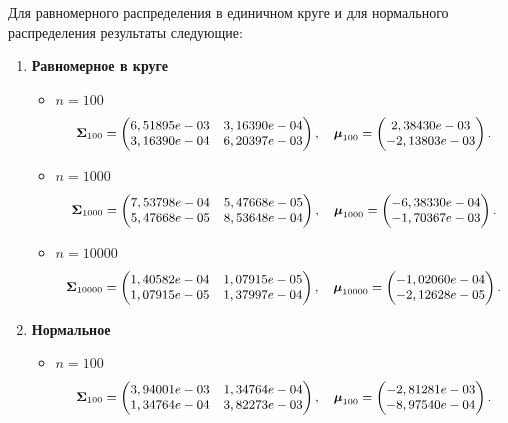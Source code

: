 \documentclass[specialist,
substylefile = spbu.rtx,
               subf,href,colorlinks=true, 12pt]{disser}
\begin{document}
Для равномерного распределения в единичном круге и для нормального распределения результаты следующие:

\begin{enumerate}
    \item \textbf{Равномерное в круге}
    
    \begin{itemize}
    \item $n=100$
    \[\small 
      \mathbf{\Sigma}_{100}=\begin{pmatrix}
6,51895e-03 & 3,16390e-04 \\
3,16390e-04 & 6,20397e-03 
\end{pmatrix}, \quad \boldsymbol{\mu}_{100}= \begin{pmatrix}
2,38430e-03  \\
-2,13803e-03
\end{pmatrix}.
    \]
    
    \item $n=1000$
    \[
    \small 
      \mathbf{\Sigma}_{1000}= \begin{pmatrix}
7,53798e-04 & 5,47668e-05  \\
5,47668e-05 & 8,53648e-04
\end{pmatrix}, \quad \boldsymbol{\mu}_{1000}=\begin{pmatrix}
-6,38330e-04  \\
-1,70367e-03
\end{pmatrix}.
    \]
    
    \item $n=10000$ 
    \[
    \small 
     \mathbf{\Sigma}_{10000}=
\begin{pmatrix}
1,40582e-04 & 1,07915e-05 \\
1,07915e-05 & 1,37997e-04
\end{pmatrix}, \quad \boldsymbol{\mu}_{10000}= \begin{pmatrix}
-1,02060e-04  \\
-2,12628e-05 
\end{pmatrix}.
    \]
\end{itemize}    

    \item \textbf{Нормальное}

        \begin{itemize}
    \item $n=100$
    \[
    \small 
       \mathbf{\Sigma}_{100}=\begin{pmatrix}
3,94001e-03 & 1,34764e-04 \\
1,34764e-04 & 3,82273e-03
\end{pmatrix}, \quad \boldsymbol{\mu}_{100}= \begin{pmatrix}
-2,81281e-03\\
-8,97540e-04
\end{pmatrix}.
    \]
    

\end{itemize}
\end{enumerate}
\end{document}
